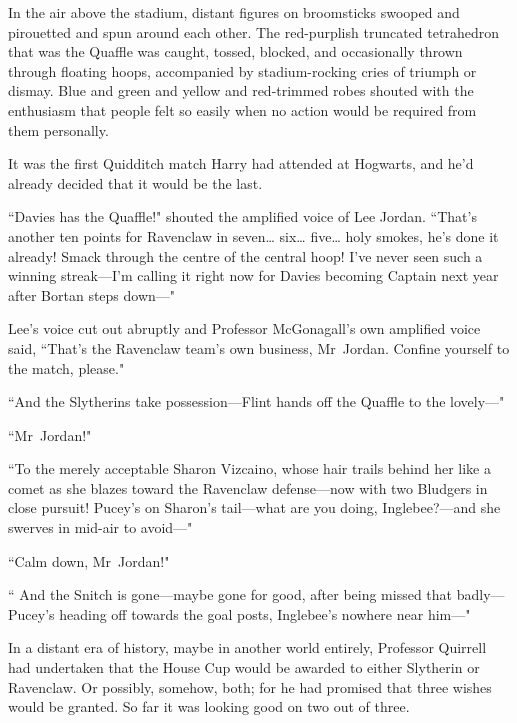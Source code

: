 \later

In the air above the stadium, distant figures on broomsticks swooped and pirouetted and spun around each other. The red-purplish truncated tetrahedron that was the Quaffle was caught, tossed, blocked, and occasionally thrown through floating hoops, accompanied by stadium-rocking cries of triumph or dismay. Blue and green and yellow and red-trimmed robes shouted with the enthusiasm that people felt so easily when no action would be required from them personally.

It was the first Quidditch match Harry had attended at Hogwarts, and he'd already decided that it would be the last.

``Davies has the Quaffle!" shouted the amplified voice of Lee Jordan. ``That's another ten points for Ravenclaw in seven{\ldots} six{\ldots} five{\ldots} holy smokes, he's done it already! Smack through the centre of the central hoop! I've never seen such a winning streak—I'm calling it right now for Davies becoming Captain next year after Bortan steps down—"

Lee's voice cut out abruptly and Professor McGonagall's own amplified voice said, ``That's the Ravenclaw team's own business, Mr~Jordan. Confine yourself to the match, please."

``And the Slytherins take possession—Flint hands off the Quaffle to the lovely—"

``Mr~Jordan!"

``To the merely acceptable Sharon Vizcaino, whose hair trails behind her like a comet as she blazes toward the Ravenclaw defense—now with two Bludgers in close pursuit! Pucey's on Sharon's tail—what are you doing, Inglebee?—and she swerves in mid-air to avoid—"

``Calm down, Mr~Jordan!"

`` And the Snitch is gone—maybe gone for good, after being missed that badly—Pucey's heading off towards the goal posts, Inglebee's nowhere near him—"

In a distant era of history, maybe in another world entirely, Professor Quirrell had undertaken that the House Cup would be awarded to either Slytherin or Ravenclaw. Or possibly, somehow, both; for he had promised that three wishes would be granted. So far it was looking good on two out of three.


